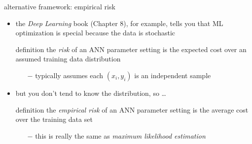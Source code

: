 \documentclass[xcolor={svgnames},
               hyperref={colorlinks,citecolor=DeepPink4,linkcolor=FireBrick,urlcolor=Maroon}]
               {beamer}
\begin{document}
\begin{frame}{alternative framework: empirical risk}

\begin{itemize}
\item the \emph{Deep Learning} book (Chapter 8), for example, tells you that ML optimization is special because the data is stochastic

\begin{block}{definition}
the \emph{risk} of an ANN parameter setting is the expected cost over an assumed  training data distribution
\end{block}

    \begin{itemize}
    \item[$-$] typically assumes each $(x_i,y_i)$ is an independent sample
    \end{itemize}

\item but you don't tend to know the distribution, so \dots

\begin{block}{definition}
the \emph{empirical risk} of an ANN parameter setting is the average cost over the training data set
\end{block}

    \begin{itemize}
    \item[$-$] this is really the same as \emph{maximum likelihood estimation}
    \end{itemize}

\end{itemize}
\end{frame}
\end{document}
